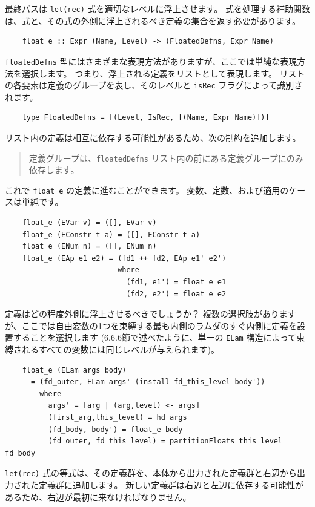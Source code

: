 \documentclass{jbook}
\begin{document}
最終パスは \texttt{let(rec)} 式を適切なレベルに浮上させます。
式を処理する補助関数は、式と、その式の外側に浮上されるべき定義の集合を返す必要があります。

\begin{verbatim}
	float_e :: Expr (Name, Level) -> (FloatedDefns, Expr Name)
\end{verbatim}

\texttt{floatedDefns} 型にはさまざまな表現方法がありますが、ここでは単純な表現方法を選択します。
つまり、浮上される定義をリストとして表現します。
リストの各要素は定義のグループを表し、そのレベルと \texttt{isRec} フラグによって識別されます。

\begin{verbatim}
	type FloatedDefns = [(Level, IsRec, [(Name, Expr Name)])]
\end{verbatim}

リスト内の定義は相互に依存する可能性があるため、次の制約を追加します。

\begin{quote}
	定義グループは、\texttt{floatedDefns} リスト内の前にある定義グループにのみ依存します。
\end{quote}

これで \texttt{float\_e} の定義に進むことができます。
変数、定数、および適用のケースは単純です。

\begin{verbatim}
	float_e (EVar v) = ([], EVar v)
	float_e (EConstr t a) = ([], EConstr t a)
	float_e (ENum n) = ([], ENum n)
	float_e (EAp e1 e2) = (fd1 ++ fd2, EAp e1' e2')
	                      where
	                        (fd1, e1') = float_e e1
	                        (fd2, e2') = float_e e2
\end{verbatim}

定義はどの程度外側に浮上させるべきでしょうか？
複数の選択肢がありますが、ここでは自由変数の1つを束縛する最も内側のラムダのすぐ内側に定義を設置することを選択します
(6.6.6節で述べたように、単一の \texttt{ELam} 構造によって束縛されるすべての変数には同じレベルが与えられます)。

\begin{verbatim}
	float_e (ELam args body)
	  = (fd_outer, ELam args' (install fd_this_level body'))
	    where
	      args' = [arg | (arg,level) <- args]
	      (first_arg,this_level) = hd args
	      (fd_body, body') = float_e body
	      (fd_outer, fd_this_level) = partitionFloats this_level fd_body
\end{verbatim}

\texttt{let(rec)} 式の等式は、その定義群を、本体から出力された定義群と右辺から出力された定義群に追加します。
新しい定義群は右辺と左辺に依存する可能性があるため、右辺が最初に来なければなりません。
\end{document}

